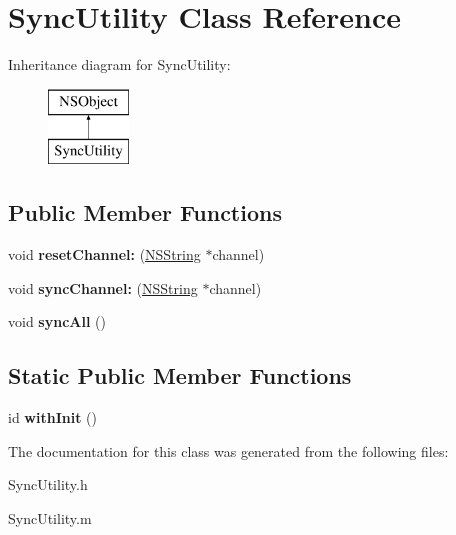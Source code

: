 \hypertarget{interface_sync_utility}{
\section{\-Sync\-Utility \-Class \-Reference}
\label{interface_sync_utility}
}
\-Inheritance diagram for \-Sync\-Utility\-:\begin{figure}[H]
\begin{center}
\leavevmode
\includegraphics[height=2.000000cm]{interface_sync_utility}
\end{center}
\end{figure}
\subsection*{\-Public \-Member \-Functions}
\begin{DoxyCompactItemize}
\item 
\hypertarget{interface_sync_utility_a8bab208713f4e5dd221e6bbbc82dee1c}{
void {\bfseries reset\-Channel\-:} (\hyperlink{class_n_s_string}{\-N\-S\-String} $\ast$channel)}
\label{interface_sync_utility_a8bab208713f4e5dd221e6bbbc82dee1c}

\item 
\hypertarget{interface_sync_utility_af75dac0e51cb131bd02f992050147611}{
void {\bfseries sync\-Channel\-:} (\hyperlink{class_n_s_string}{\-N\-S\-String} $\ast$channel)}
\label{interface_sync_utility_af75dac0e51cb131bd02f992050147611}

\item 
\hypertarget{interface_sync_utility_a3dc655a5acdae2668c30bddf698b0c15}{
void {\bfseries sync\-All} ()}
\label{interface_sync_utility_a3dc655a5acdae2668c30bddf698b0c15}

\end{DoxyCompactItemize}
\subsection*{\-Static \-Public \-Member \-Functions}
\begin{DoxyCompactItemize}
\item 
\hypertarget{interface_sync_utility_ad26f93787ce5756818660a9bb9061d95}{
id {\bfseries with\-Init} ()}
\label{interface_sync_utility_ad26f93787ce5756818660a9bb9061d95}

\end{DoxyCompactItemize}


\-The documentation for this class was generated from the following files\-:\begin{DoxyCompactItemize}
\item 
\-Sync\-Utility.\-h\item 
\-Sync\-Utility.\-m\end{DoxyCompactItemize}
